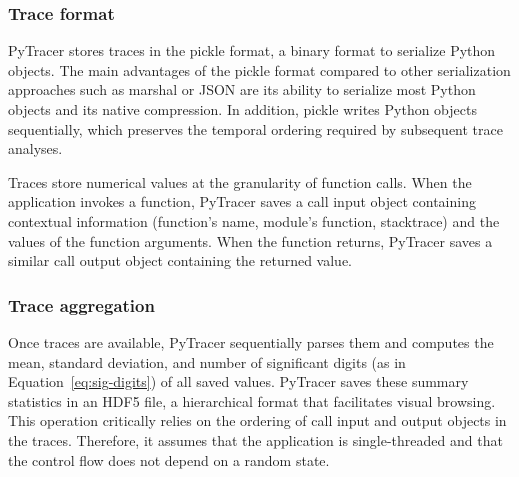 \documentclass[11pt]{article}
\newcommand{\pytracer}[0]{PyTracer\xspace}
\begin{document}

\subsubsection{Trace format}

\pytracer stores traces in the pickle format, a binary format to serialize Python objects.
The main advantages of the pickle format compared to other serialization approaches such as marshal or JSON are its ability to serialize most Python objects and its native compression.  In addition, pickle writes Python objects sequentially, which preserves the temporal ordering required by subsequent trace analyses.

Traces store numerical values at the granularity of function calls. When the application invokes a function, \pytracer saves a call input object containing contextual information (function's name, module's function, stacktrace) and the values of the function arguments. When the function returns, \pytracer saves a similar call output object containing the returned value. 


\subsubsection{Trace aggregation}

Once traces are available, \pytracer sequentially parses them and computes the mean, standard deviation, and number of significant digits (as in Equation~\ref{eq:sig-digits}) of all saved values. \pytracer saves these summary statistics in an HDF5 file, a hierarchical format that facilitates visual browsing. This operation critically relies on the ordering of call input and output objects in the traces. Therefore, it assumes that the application is single-threaded and that the control flow does not depend on a random state. 
\end{document}
